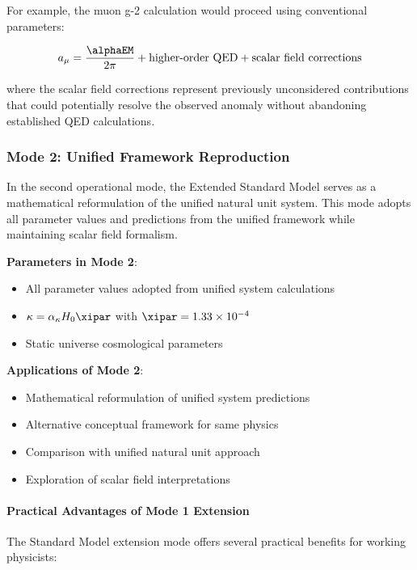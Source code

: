 	For example, the muon g-2 calculation would proceed using conventional parameters:
	
	\begin{equation}
		a_\mu = \frac{\alphaEM}{2\pi} + \text{higher-order QED} + \text{scalar field corrections}
	\end{equation}
	
	where the scalar field corrections represent previously unconsidered contributions that could potentially resolve the observed anomaly without abandoning established QED calculations.
	
	\subsubsection{Mode 2: Unified Framework Reproduction}
	\label{subsubsec:mode2_unified_reproduction}
	
	In the second operational mode, the Extended Standard Model serves as a mathematical reformulation of the unified natural unit system. This mode adopts all parameter values and predictions from the unified framework while maintaining scalar field formalism.
	
	\textbf{Parameters in Mode 2}:
	\begin{itemize}
		\item All parameter values adopted from unified system calculations
		\item $\kappa = \alpha_\kappa H_0 \xipar$ with $\xipar = 1.33 \times 10^{-4}$
		\item Static universe cosmological parameters
	\end{itemize}
	
	\textbf{Applications of Mode 2}:
	\begin{itemize}
		\item Mathematical reformulation of unified system predictions
		\item Alternative conceptual framework for same physics
		\item Comparison with unified natural unit approach
		\item Exploration of scalar field interpretations
	\end{itemize}
	
	\paragraph{Practical Advantages of Mode 1 Extension}
	\label{par:practical_advantages_mode1}
	
	The Standard Model extension mode offers several practical benefits for working physicists:
	
